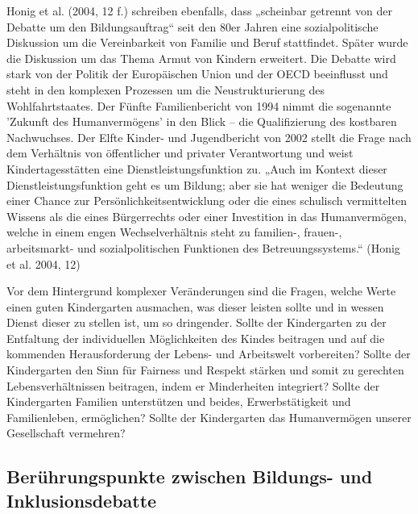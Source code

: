 Honig et al. (2004, 12 f.) schreiben ebenfalls, dass „scheinbar getrennt von der Debatte um den Bildungsauftrag“ seit den 80er Jahren eine sozialpolitische Diskussion um die Vereinbarkeit von Familie und Beruf stattfindet. Später wurde die Diskussion um das Thema Armut von Kindern erweitert. Die Debatte wird stark von der Politik der Europäischen Union und der OECD beeinflusst und steht in den komplexen Prozessen um die Neustrukturierung des Wohlfahrtstaates. 
Der Fünfte Familienbericht von 1994 nimmt die sogenannte 'Zukunft des Humanvermögens' in den Blick -- die Qualifizierung des kostbaren Nachwuchses. Der Elfte Kinder- und Jugendbericht von 2002 stellt die Frage nach dem Verhältnis von öffentlicher und privater Verantwortung und weist Kindertagesstätten eine Dienstleistungsfunktion zu. „Auch im Kontext dieser Dienstleistungsfunktion geht es um Bildung; aber sie hat weniger die Bedeutung einer Chance zur Persönlichkeitsentwicklung oder die eines schulisch vermittelten Wissens als die eines Bürgerrechts oder einer Investition in das Humanvermögen, welche in einem engen Wechselverhältnis steht zu familien-, frauen-, arbeitsmarkt- und sozialpolitischen Funktionen des Betreuungssystems.“ (Honig et al. 2004, 12)  
 
Vor dem Hintergrund komplexer Veränderungen sind die Fragen, welche Werte einen guten Kindergarten ausmachen, was dieser leisten sollte und in wessen Dienst dieser zu stellen ist, um so dringender. Sollte der Kindergarten zu der Entfaltung der individuellen Möglichkeiten des Kindes beitragen und auf die kommenden Herausforderung der Lebens- und Arbeitswelt vorbereiten? Sollte der Kindergarten den Sinn für Fairness und Respekt stärken und somit zu gerechten Lebensverhältnissen beitragen, indem er Minderheiten integriert? Sollte der Kindergarten Familien unterstützen und beides, Erwerbstätigkeit und Familienleben, ermöglichen? Sollte der Kindergarten das Humanvermögen unserer Gesellschaft vermehren? 

\subsection{Berührungspunkte zwischen Bildungs- und Inklusionsdebatte}

